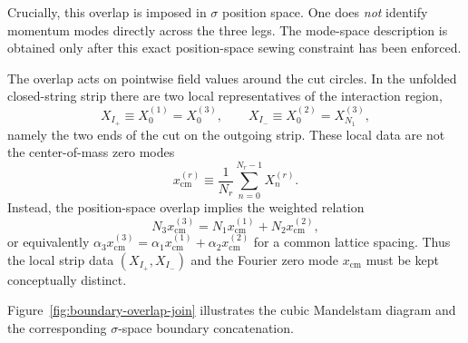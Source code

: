 \documentclass[11pt]{article}
\numberwithin{equation}{section}
\begin{document}
Crucially, this overlap is imposed in $\sigma$ position space. One does \emph{not} identify momentum modes directly across the three legs. The mode-space description is obtained only after this exact position-space sewing constraint has been enforced.

The overlap acts on pointwise field values around the cut circles. In the unfolded closed-string strip there are two local representatives of the interaction region,
\begin{equation}
\label{eq:s9-007}
X_{I_+}\equiv X_0^{(1)}=X_0^{(3)},
\qquad
X_{I_-}\equiv X_0^{(2)}=X_{N_1}^{(3)},
\end{equation}
namely the two ends of the cut on the outgoing strip. These local data are not the center-of-mass zero modes
\begin{equation}
\label{eq:s9-008}
x_{\mathrm{cm}}^{(r)}\equiv \frac{1}{N_r}\sum_{n=0}^{N_r-1}X_n^{(r)}.
\end{equation}
Instead, the position-space overlap implies the weighted relation
\begin{equation}
\label{eq:s9-009}
N_3 x_{\mathrm{cm}}^{(3)} = N_1 x_{\mathrm{cm}}^{(1)} + N_2 x_{\mathrm{cm}}^{(2)},
\end{equation}
or equivalently $\alpha_3 x_{\mathrm{cm}}^{(3)}=\alpha_1 x_{\mathrm{cm}}^{(1)}+\alpha_2 x_{\mathrm{cm}}^{(2)}$ for a common lattice spacing. Thus the local strip data $(X_{I_+},X_{I_-})$ and the Fourier zero mode $x_{\mathrm{cm}}$ must be kept conceptually distinct.

Figure~\ref{fig:boundary-overlap-join} illustrates the cubic Mandelstam diagram and the corresponding $\sigma$-space boundary concatenation.
\end{document}
